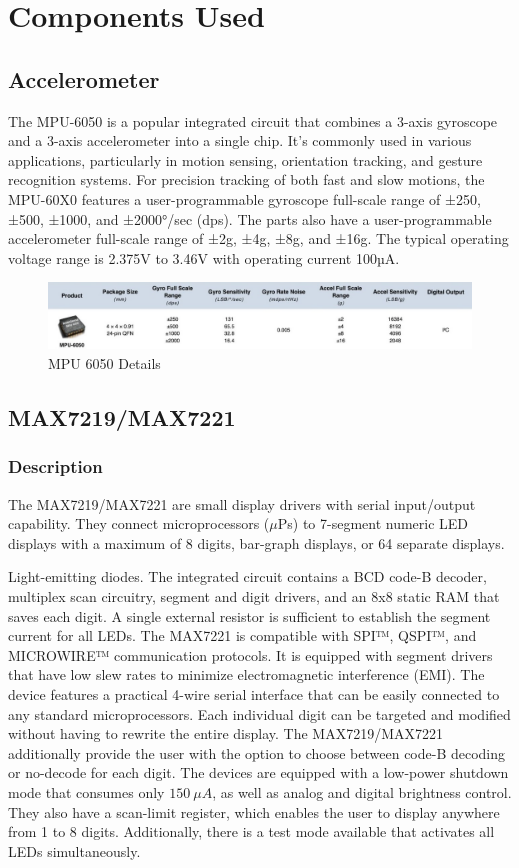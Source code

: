 \newpage
\section{Components Used}

\subsection{Accelerometer}
The MPU-6050 is a popular integrated circuit that combines a 3-axis gyroscope and a 3-axis accelerometer into a single chip. It's commonly used in various applications, particularly in motion sensing, orientation tracking, and gesture recognition systems.
For precision tracking of both fast and slow motions, the MPU-60X0 features a user-programmable gyroscope full-scale range of ±250, ±500, ±1000, and ±2000°/sec (dps). The parts also have a user-programmable accelerometer full-scale range of ±2g, ±4g, ±8g, and ±16g. The typical operating voltage range is 2.375V to 3.46V with operating current 100µA.
\begin{figure}[H]
    \centering
    \includegraphics[width=1\linewidth]{Files/Images/Accelerometer.jpg}
    \caption{MPU 6050 Details}
    \label{fig:enter-label}
\end{figure}

\subsection{MAX7219/MAX7221}
\subsubsection*{Description}
The MAX7219/MAX7221 are small display drivers with serial input/output capability. They connect microprocessors ($\mu$Ps) to 7-segment numeric LED displays with a maximum of 8 digits, bar-graph displays, or 64 separate displays.

Light-emitting diodes. The integrated circuit contains a BCD code-B decoder, multiplex scan circuitry, segment and digit drivers, and an 8x8 static RAM that saves each digit. A single external resistor is sufficient to establish the segment current for all LEDs. The MAX7221 is compatible with SPI™, QSPI™, and MICROWIRE™ communication protocols. It is equipped with segment drivers that have low slew rates to minimize electromagnetic interference (EMI).
The device features a practical 4-wire serial interface that can be easily connected to any standard microprocessors. Each individual digit can be targeted and modified without having to rewrite the entire display. The MAX7219/MAX7221 additionally provide the user with the option to choose between code-B decoding or no-decode for each digit.
The devices are equipped with a low-power shutdown mode that consumes only $\SI{150}{\mu A}$, as well as analog and digital brightness control. They also have a scan-limit register, which enables the user to display anywhere from 1 to 8 digits. Additionally, there is a test mode available that activates all LEDs simultaneously.
